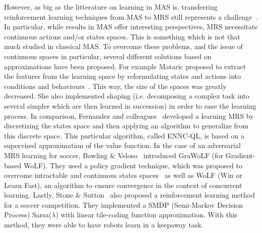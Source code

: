     However, as big as the litterature on learning in MAS is, transferring reinforcement learning techniques from MAS to MRS still represents a challenge~\parencite{Yang2005}. In particular, while results in MAS offer interesting perspectives, MRS necessitate continuous actions and/or states spaces. This is something which is not that much studied in classical MAS. To overcome these problems, and the issue of continuous spaces in particular, several different solutions based on approximations have been proposed. For example Mataric proposed to extract the features from the learning space by reformulating states and actions into conditions and behaviours~\parencite{Mataric1997}. This way, the size of the spaces was greatly decreased. She also implemented shaping (i.e. decomposing a complex task into several simpler which are then learned in succession) in order to ease the learning process. In comparison, Fernandez and colleagues~\parencite{Fernandez2005} developed a learning MRS by discretizing the states space and then applying an algorithm to generalize from this discrete space. This particular algorithm, called ENNC-QL, is based on a supervised approximation of the value function. In the case of an adversarial MRS learning for soccer, Bowling \& Veloso~\parencite{Bowling2003} introduced GraWoLF (for Gradient-based WoLF). They used a policy gradient technique, which was proposed to overcome intractable and continuous states spaces~\parencite{Sutton2000} as well as WoLF (Win or Learn Fast), an algorithm to ensure convergence in the context of concurrent learning. Lastly, Stone \& Sutton~\parencite{Stone2001} also proposed a reinforcement learning method for a soccer competition. They implemented a SMDP (Semi-Markov Decision Process) Sarsa(\(\lambda\)) with linear tile-coding function approximation. With this method, they were able to have robots learn in a keepaway task.
     


